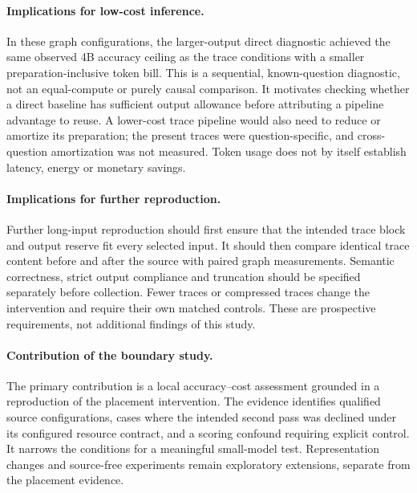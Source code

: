 \paragraph{Implications for low-cost inference.} In these graph configurations, the larger-output direct diagnostic achieved the same observed 4B accuracy ceiling as the trace conditions with a smaller preparation-inclusive token bill. This is a sequential, known-question diagnostic, not an equal-compute or purely causal comparison. It motivates checking whether a direct baseline has sufficient output allowance before attributing a pipeline advantage to reuse. A lower-cost trace pipeline would also need to reduce or amortize its preparation; the present traces were question-specific, and cross-question amortization was not measured. Token usage does not by itself establish latency, energy or monetary savings.

\paragraph{Implications for further reproduction.} Further long-input reproduction should first ensure that the intended trace block and output reserve fit every selected input. It should then compare identical trace content before and after the source with paired graph measurements. Semantic correctness, strict output compliance and truncation should be specified separately before collection. Fewer traces or compressed traces change the intervention and require their own matched controls. These are prospective requirements, not additional findings of this study.

\paragraph{Contribution of the boundary study.} The primary contribution is a local accuracy--cost assessment grounded in a reproduction of the placement intervention. The evidence identifies qualified source configurations, cases where the intended second pass was declined under its configured resource contract, and a scoring confound requiring explicit control. It narrows the conditions for a meaningful small-model test. Representation changes and source-free experiments remain exploratory extensions, separate from the placement evidence.


